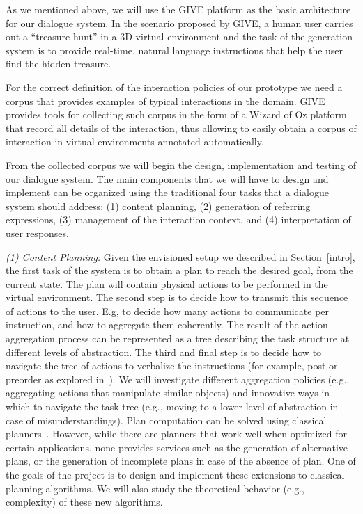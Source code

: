 As we mentioned above, we will use the GIVE platform as the basic architecture 
for our dialogue system.  In the scenario proposed by GIVE, a
human user carries out a ``treasure hunt'' in a 3D virtual environment
and the task of the generation system is to provide real-time, natural
language instructions that help the user find the hidden treasure.

For the correct definition of the interaction policies of our prototype we need
a corpus that provides examples of typical interactions in the domain. GIVE
provides tools for collecting such corpus in the form of a Wizard of Oz
platform that record all details of the interaction, thus
allowing to easily obtain a corpus of interaction in virtual environments
annotated automatically.

From the collected corpus we will begin the design, implementation and testing
of our dialogue system.  The main components that we will have to design and 
implement can be organized using the traditional four tasks that a dialogue 
system should address: (1) content planning, (2)
generation of referring expressions, (3) management of the interaction context, and
(4) interpretation of user responses. 

\emph{(1) Content Planning:} Given the envisioned setup we described in Section~\ref{intro},
the first task of the system is to obtain a plan to reach the desired goal, from the current state.
The plan will contain physical actions to be performed in the virtual environment. The second
step is to decide how to transmit this sequence of actions to the user. E.g, to decide
how many actions to communicate per instruction, and how to aggregate them
coherently. The result of the action aggregation process can be represented as a
tree describing the task structure at different levels of abstraction. The third
and final step is to decide how to navigate the tree of actions to verbalize the
instructions (for example, post or preorder as
explored in~\cite{foster-etal-ijcai2009}). We will investigate
different aggregation policies (e.g., aggregating actions that
manipulate similar objects) and innovative ways in which to navigate the task tree
(e.g., moving to a lower level of abstraction in case of misunderstandings).
Plan computation can be solved using classical planners~\cite{nau04}.
However, while there are planners that work well when optimized for certain
applications, none provides services such as the generation of alternative
plans, or the generation of incomplete plans in case of the absence of plan.
One of the goals of the project is to design and implement these extensions to 
classical planning algorithms. We will also study the theoretical behavior (e.g., complexity) of
these new algorithms. 

